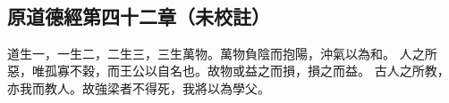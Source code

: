 ﻿%
%

\chapter{~}

\section{原道德經第四十二章（未校註）}

\begin{withgezhu}

\zhsong


道生一，一生二，二生三，三生萬物。萬物負陰而抱陽，沖氣以為和。
人之所惡，唯孤寡不榖，而王公以自名也。故物或益之而損，損之而益。
古人之所教，亦我而教人。故強梁者不得死，我將以為\textcolor{tongjia-color}{學父}。

\end{withgezhu}
